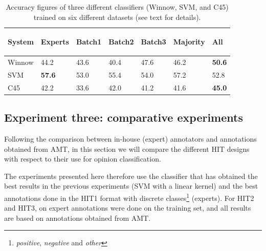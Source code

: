 \documentclass[11pt, a4paper,onecolumn]{article}
\begin{document}
\begin{table}
\begin{center}
\begin{small}
\begin{tabular}{|l|l|l|l|l|l|l|} \hline
 System & 
 {\begin{sideways}\parbox{2cm}{\centering Experts}\end{sideways}} &
 {\begin{sideways}\parbox{2cm}{\centering Batch1}\end{sideways}} &
 {\begin{sideways}\parbox{2cm}{\centering Batch2}\end{sideways}} &
 {\begin{sideways}\parbox{2cm}{\centering Batch3}\end{sideways}} &
 {\begin{sideways}\parbox{2cm}{\centering Majority}\end{sideways}} &
 {\begin{sideways}\parbox{2cm}{\centering All}\end{sideways}} \\ \hline
 Winnow & 44.2 & 43.6 & 40.4 & 47.6 & 46.2 & \textbf{50.6} \\ \hline
 SVM & \textbf{57.6} & 53.0 & 55.4 & 54.0 & 57.2 & 52.8 \\ \hline
 C45 & 42.2 & 33.6 & 42.0 & 41.2 & 41.6 & \textbf{45.0} \\ \hline
\end{tabular}
\end{small}
\end{center}
\caption{Accuracy figures of three different classifiers (Winnow, SVM, and C45) trained on six different datasets (see text for details).}
\label{table:amtvsexp}
\end{table}



\subsection{Experiment three: comparative experiments}
\label{sect:eval3}

Following the comparison between in-house (expert) annotators and annotations obtained from AMT, in this section we will compare the different HIT designs with respect to their use for opinion classification.

The experiments presented here therefore use the classifier that has obtained the best results in the previous experiments (SVM with a linear kernel) and the best annotations done in the HIT1 format  with discrete classes\footnote{\emph{positive}, \emph{negative} and \emph{other}} (experts).  For HIT2 and HIT3, on expert annotations were done on the training set, and all results are based on annotations obtained from AMT.
\end{document}
